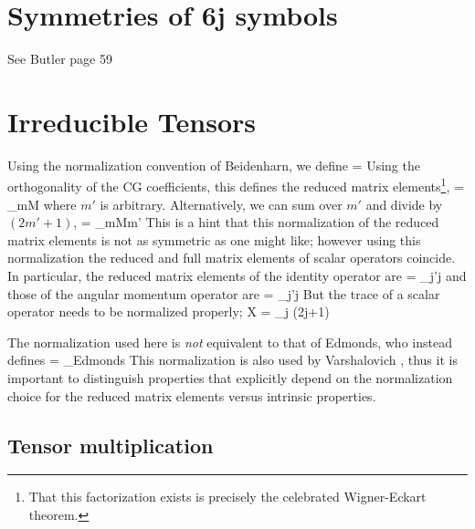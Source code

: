 \documentclass[12pt]{article}
\begin{document}
\section{Symmetries of 6j symbols}


See Butler page 59

\section{Irreducible Tensors}

Using the normalization convention of Beidenharn, we define
\beq
{}
=  \; 
\label{eq:ITensorDef}
\eeq
Using the orthogonality of the CG coefficients, this defines the
reduced matrix elements\footnote{That this factorization exists is
  precisely the celebrated Wigner-Eckart theorem.},
\beq
{}
= \sum_{mM}  
\eeq
where $m'$ is arbitrary.  Alternatively,
we can sum over $m'$ and divide by $(2m'+1)$,
\beq
{}
= \sum_{mMm'}   
\eeq
This is a hint that this normalization of the reduced matrix elements
is not as symmetric as one might like; however
using this normalization the reduced and
full matrix elements of scalar operators coincide.  In particular,
the reduced matrix elements of the identity operator are
\beq
{} = \delta_{j'j}
\eeq
and those of the angular momentum operator are
\beq
{} =  \; \delta_{j'j}
\eeq
But the trace of a scalar operator needs to be normalized properly;
\beq
\Tr X = \sum_{j} (2j+1) 
\eeq

The normalization used here
is \textit{not} equivalent to that of Edmonds,
who instead defines
\beq
{}
= _{\mbox{Edmonds}}
\;  
\eeq
This normalization is also used by Varshalovich \etal \cite{Varsh}, 
thus it is important to
distinguish properties that explicitly depend on the normalization choice
for the reduced matrix elements versus intrinsic properties.

\subsection{Tensor multiplication}
\end{document}

